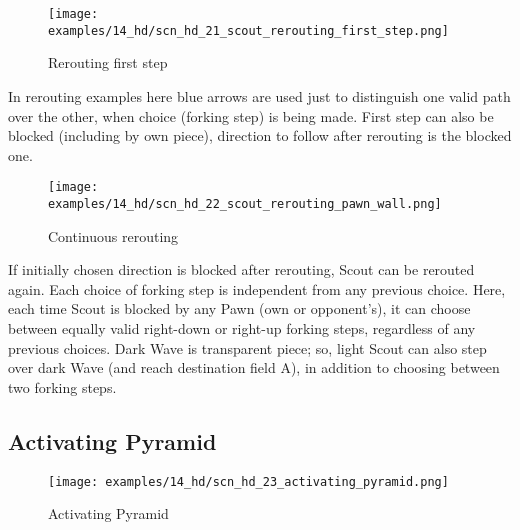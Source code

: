 \vspace*{0.9\baselineskip}
\noindent
\begin{wrapfigure}[9]{l}{0.41\textwidth}
\centering
\texttt{[image: examples/14\_hd/scn\_hd\_21\_scout\_rerouting\_first\_step.png]}
\vspace*{-0.5\baselineskip}
\caption{Rerouting first step}
\label{fig:scn_hd_21_scout_rerouting_first_step}
\end{wrapfigure}
\indent
In rerouting examples here blue arrows are used just to distinguish one valid
path over the other, when choice (forking step) is being made.\newline
\indent
First step can also be blocked (including by own piece), direction to follow
after rerouting is the blocked one.

\vspace*{-0.7\baselineskip}
\noindent
\begin{wrapfigure}[10]{l}{0.41\textwidth} %
\centering
\texttt{[image: examples/14\_hd/scn\_hd\_22\_scout\_rerouting\_pawn\_wall.png]}
\vspace*{-0.5\baselineskip}
\caption{Continuous rerouting}
\label{fig:scn_hd_22_scout_rerouting_pawn_wall}
\end{wrapfigure}
\indent
If initially chosen direction is blocked after rerouting, Scout can be rerouted
again. Each choice of forking step is independent from any previous choice.\newline
\indent
Here, each time Scout is blocked by any Pawn (own or opponent's), it can choose
between equally valid right-down or right-up forking steps, regardless of any
previous choices.
Dark Wave is transparent piece; so, light Scout can also step over dark Wave (and
reach destination field A), in addition to choosing between two forking steps.

\clearpage %

\subsection*{Activating Pyramid}
\label{sec:Hemera's Dawn/Scout/Activating Pyramid}

\vspace*{-1.3\baselineskip}
\noindent
\begin{figure}[!h]
\texttt{[image: examples/14\_hd/scn\_hd\_23\_activating\_pyramid.png]}
\vspace*{-1.3\baselineskip}
\caption{Activating Pyramid}
\label{fig:scn_hd_23_activating_pyramid}
\end{figure}

